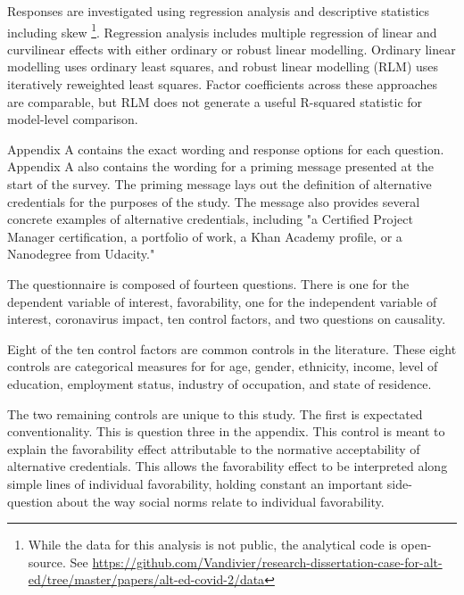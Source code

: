 \documentclass[review]{elsarticle}
\begin{document}
Responses are investigated using regression analysis and descriptive statistics including skew
\footnote{
    While the data for this analysis is not public, the analytical code is open-source.
    See \url{https://github.com/Vandivier/research-dissertation-case-for-alt-ed/tree/master/papers/alt-ed-covid-2/data}
}.
Regression analysis includes multiple regression of linear and curvilinear effects
with either ordinary or robust linear modelling.
Ordinary linear modelling uses ordinary least squares,
and robust linear modelling (RLM) uses iteratively reweighted least squares.
Factor coefficients across these approaches are comparable,
but RLM does not generate a useful R-squared statistic
for model-level comparison.

Appendix A contains the exact wording and response options for each question.
Appendix A also contains the wording for a priming message presented at the start of the survey.
The priming message lays out the definition of alternative credentials for the purposes of the study.
The message also provides several concrete examples of alternative credentials,
including "a Certified Project Manager certification,
a portfolio of work, a Khan Academy profile, or a Nanodegree from Udacity."

The questionnaire is composed of fourteen questions.
There is one for the dependent variable of interest, favorability,
one for the independent variable of interest, coronavirus impact,
ten control factors,
and two questions on causality.

Eight of the ten control factors are common controls in the literature.
These eight controls are categorical measures for
for age, gender, ethnicity, income,
level of education, employment status, industry of occupation, and state of residence.

The two remaining controls are unique to this study.
The first is expectated conventionality.
This is question three in the appendix.
This control is meant to explain the favorability effect attributable to the normative acceptability of alternative credentials.
This allows the favorability effect to be interpreted along simple lines of individual favorability,
holding constant an important side-question about the way social norms relate to individual favorability.
\end{document}
